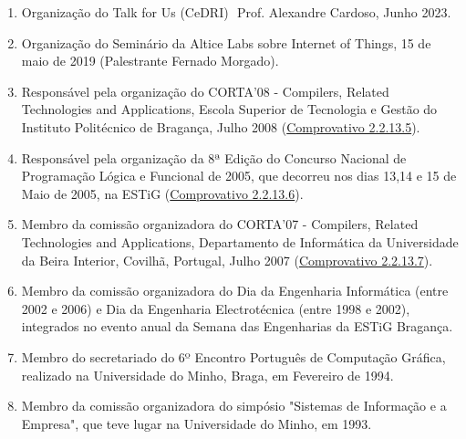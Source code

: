 \documentclass[11pt]{article}
\begin{document}
\begin{enumerate}
\item {Organização do Talk for Us (CeDRI)  Prof. Alexandre Cardoso, Junho 2023.}
\item {Organização do Seminário da Altice Labs sobre Internet of Things, 15 de maio de 2019 (Palestrante Fernado Morgado).}
\item {Responsável pela organização do CORTA'08 - Compilers, Related Technologies and Applications, Escola Superior de Tecnologia e Gestão do Instituto Politécnico de Bragança, Julho 2008 (\href{run:ComprovativosCOCP/COCPCoRTA08.pdf}{Comprovativo 2.2.13.5}).}
\item {Responsável pela organização da 8ª Edição do Concurso Nacional de Programação Lógica e Funcional de 2005, que decorreu nos dias 13,14 e 15 de Maio de 2005, na ESTiG (\href{run:ComprovativosCOCP/COCNPLF05.pdf}{Comprovativo 2.2.13.6}).}
\item {Membro da comissão organizadora do CORTA'07 - Compilers, Related Technologies and Applications, Departamento de Informática da Universidade da Beira Interior, Covilhã, Portugal, Julho 2007 (\href{run:ComprovativosCOCP/COCoRTA2007.pdf}{Comprovativo 2.2.13.7}).}
\item {Membro da comissão organizadora do Dia da Engenharia Informática (entre 2002 e 2006) e Dia da Engenharia Electrotécnica (entre 1998 e 2002), integrados no evento anual da Semana das Engenharias da ESTiG Bragança.}
\item {Membro do secretariado do 6º Encontro Português de Computação Gráfica, realizado na Universidade do Minho, Braga, em Fevereiro de 1994. }
\item {Membro da comissão organizadora do simpósio "Sistemas de Informação e a Empresa", que teve lugar na Universidade do Minho, em 1993. }
\end{enumerate}
\end{document}
